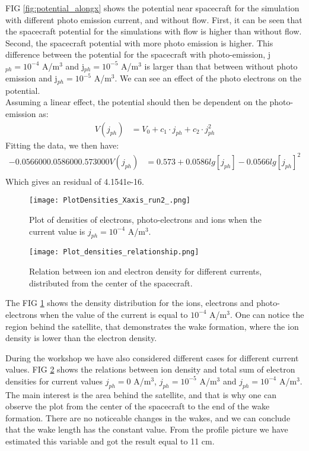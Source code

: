\documentclass[aip, 
rsi, 
amsmath,
amssymb,
longbibliography,
preprint]{revtex4-1}
\begin{document}
FIG \ref{fig:potential_alongx} shows the potential near spacecraft for the simulation with different photo emission current, and without flow. First, it can be seen that the spacecraft potential for the simulations with flow is higher than without flow. Second, the spacecraft potential with more photo emission is higher. This difference between the potential for the spacecraft  with photo-emission, j$_{ph} = 10^{-4}$ A/m$^3$ and  j$_{ph} = 10^{-5}$ A/m$^3$ is larger than that between without photo emission and  j$_{ph} = 10^{-5}$ A/m$^3$. We can see an effect of the photo electrons on the potential.\\

Assuming a linear effect, the potential should then be dependent on the photo-emission as:
\begin{align*}
V\left(j_{ph}\right) &= V_0 + c_1\cdot j_{ph} + c_2\cdot j_{ph}^2
\end{align*}
Fitting the data, we then have:
\begin{align*}
 -0.056600   0.058600   0.573000
V\left(j_{ph}\right) &= 0.573 + 0.0586 lg\left[j_{ph}\right] - 0.0566 lg\left[j_{ph}\right]^2\\
\end{align*}
Which gives an residual of 4.1541e-16.

\begin{figure}
\texttt{[image: PlotDensities\_Xaxis\_run2\_.png]}
\caption{\label{fig:densityCurrent}Plot of densities of electrons, photo-electrons and ions when the current value is \(j_{ph} = 10^{-4}\) A/m$^3$.}
\end{figure}

\begin{figure}
\texttt{[image: Plot\_densities\_relationship.png]}
\caption{\label{fig:densityCurrentRelation}Relation between ion and electron density for different currents, distributed from the center of the spacecraft.}
\end{figure}

The FIG \ref{fig:densityCurrent} shows the density distribution for the ions, electrons and photo-electrons when the value of the current is equal to $10^{-4}$ A/m$^3$. One can notice the region behind the satellite, that demonstrates the wake formation, where the ion density is lower than the electron density.\par

During the workshop we have also considered different cases for different current values. FIG \ref{fig:densityCurrentRelation} shows the relations between ion density and total sum of electron densities for current values $j_{ph}=0$ A/m$^3$, $j_{ph}=10^{-5}$ A/m$^3$ and $j_{ph}=10^{-4}$ A/m$^3$. The main interest is the area behind the satellite, and that is why one can observe the plot from the center of the spacecraft to the end of the wake formation. There are no noticeable changes in the wakes, and we can conclude that the wake length has the constant value. From the profile picture we have estimated this variable and got the result equal to 11 cm.
\end{document}

